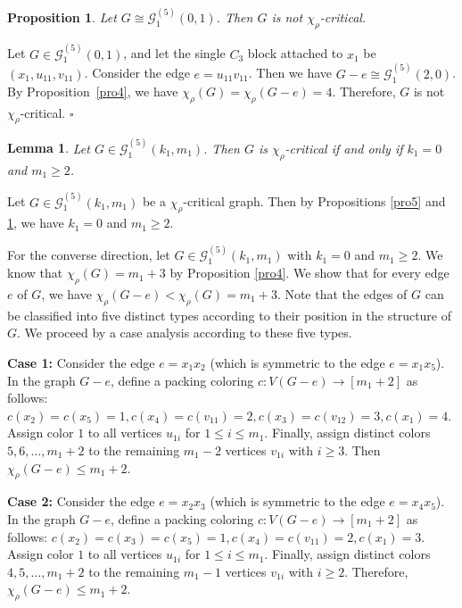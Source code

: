 \documentclass[12pt]{article}
\newtheorem{lemma}[theorem]{Lemma}
\newtheorem{proposition}[theorem]{Proposition}
\newcommand{\proof}{\noindent{\bf Proof.\ }}
\newcommand{\qed}{\hfill $\square$ \bigskip}
\begin{document}
\begin{proposition}\label{pro6}
Let $G \cong \mathcal{G}_{1}^{(5)}(0,1)$. Then $G$ is not $\chi_{\rho}$-critical. 
\end{proposition}

\proof Let $G \in \mathcal{G}_{1}^{(5)}(0,1)$,	and let the single $C_3$ block attached to $x_1$ be $(x_1,u_{11},v_{11})$. Consider the edge $e=u_{11}v_{11}$. Then we have $G-e \cong \mathcal{G}_{1}^{(5)}(2,0)$. By Proposition~\ref{pro4}, we have $\chi_{\rho}(G) = \chi_{\rho}(G - e) = 4$. Therefore, $G$ is not $\chi_{\rho}$-critical.
\qed

\begin{lemma}\label{pro7}
Let $G \in \mathcal{G}_{1}^{(5)}(k_1,m_1)$. Then $G$ is $\chi_{\rho}$-critical if and only if $k_1=0$ and $m_1\geq 2$.
\end{lemma}

\proof Let $G \in \mathcal{G}_{1}^{(5)}(k_1,m_1)$ be a $\chi_{\rho}$-critical graph. Then by Propositions \ref{pro5} and \ref{pro6}, we have $k_1=0$ and $m_1\geq 2$.
	
For the converse direction, let $G \in \mathcal{G}_{1}^{(5)}(k_1,m_1)$ with $k_1=0$ and $m_1\geq 2$. We know that  $\chi_{\rho}(G)=m_1+3$ by Proposition \ref{pro4}.  We show that for every edge $e$ of $G$, we have $\chi_{\rho}(G-e) < \chi_{\rho}(G)=m_1+3$. Note that the edges of \(G\) can be classified into five distinct types according to their position in the structure of \(G\). We proceed by a case analysis according to these five types.
	
\textbf{Case 1:} Consider the edge \( e = x_1x_2 \) 
(which is symmetric to the edge \( e = x_1x_5 \)). In the graph \( G-e \), define a packing coloring \( c : V(G-e) \to [m_1+2] \) as follows:
$c(x_2) = c(x_5) = 1, 
c(x_4) = c(v_{11}) = 2,
c(x_3) = c(v_{12}) = 3,
c(x_1) = 4.$
Assign color \(1\) to all vertices \(u_{1i}\) for \(1 \le i \le m_1\). 
Finally, assign distinct colors \(5, 6, \dots, m_1+2\) to the remaining \(m_1-2\) vertices \(v_{1i}\) with \(i \ge 3\). Then \(\chi_\rho(G-e) \le m_1+2\).
	
\textbf{Case 2:} Consider the edge $e=x_2x_3$ 
(which is symmetric to the edge $e=x_4x_5$). In the graph \( G-e \), define a packing coloring \( c : V(G-e) \to [m_1+2]\) as follows:
$c(x_2)=c(x_3)=c(x_5)= 1, 
c(x_4)=c(v_{11}) = 2,
c(x_1) = 3.$
Assign color \(1\) to all vertices \(u_{1i}\) for \(1 \le i \le m_1\). 
Finally, assign distinct colors \(4, 5, \dots, m_1+2\) to the remaining \(m_1-1\) vertices \(v_{1i}\) with \(i \ge 2\). 
Therefore, \(\chi_\rho(G-e) \le m_1+2\).
	
\end{document}

